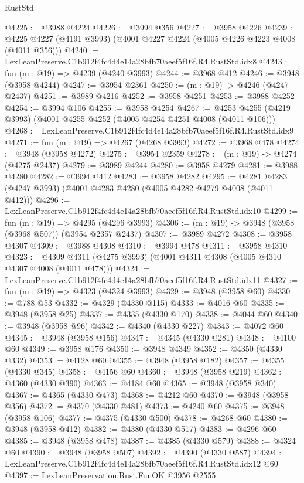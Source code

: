 \begin{lexlean}{RustStd}
\begin{coremodule}
@4225 := @3988 @4224
@4226 := @3994 @356
@4227 := @3958 @4226
@4239 := @4225 @4227 (@4191 @3993) (@4001 @4227 @4224 (@4005 @4226 @4223 @4008 (@4011 @356)))
@4240 := LexLeanPreserve.C1b912f4fc4d4e14a28bfb70aeef5f16f.R4.RustStd.idx8
@4243 := fun (m : @19) => @4239 (@4240 @3993)
@4244 := @3968 @412
@4246 := @3948 (@3958 @4244)
@4247 := @3954 @2361
@4250 := (m : @19) -> @4246 (@4247 @2437)
@4251 := @3989 @4216
@4252 := @3958 @4251
@4253 := @3988 @4252
@4254 := @3994 @106
@4255 := @3958 @4254
@4267 := @4253 @4255 (@4219 @3993) (@4001 @4255 @4252 (@4005 @4254 @4251 @4008 (@4011 @106)))
@4268 := LexLeanPreserve.C1b912f4fc4d4e14a28bfb70aeef5f16f.R4.RustStd.idx9
@4271 := fun (m : @19) => @4267 (@4268 @3993)
@4272 := @3968 @478
@4274 := @3948 (@3958 @4272)
@4275 := @3954 @2359
@4278 := (m : @19) -> @4274 (@4275 @2437)
@4279 := @3989 @4244
@4280 := @3958 @4279
@4281 := @3988 @4280
@4282 := @3994 @412
@4283 := @3958 @4282
@4295 := @4281 @4283 (@4247 @3993) (@4001 @4283 @4280 (@4005 @4282 @4279 @4008 (@4011 @412)))
@4296 := LexLeanPreserve.C1b912f4fc4d4e14a28bfb70aeef5f16f.R4.RustStd.idx10
@4299 := fun (m : @19) => @4295 (@4296 @3993)
@4306 := (m : @19) -> @3948 (@3958 (@3968 @507)) (@3954 @2357 @2437)
@4307 := @3989 @4272
@4308 := @3958 @4307
@4309 := @3988 @4308
@4310 := @3994 @478
@4311 := @3958 @4310
@4323 := @4309 @4311 (@4275 @3993) (@4001 @4311 @4308 (@4005 @4310 @4307 @4008 (@4011 @478)))
@4324 := LexLeanPreserve.C1b912f4fc4d4e14a28bfb70aeef5f16f.R4.RustStd.idx11
@4327 := fun (m : @19) => @4323 (@4324 @3993)
@4329 := @3948 (@3958 @60)
@4330 := @788 @53
@4332 := @4329 (@4330 @115)
@4333 := @4016 @60
@4335 := @3948 (@3958 @25)
@4337 := @4335 (@4330 @170)
@4338 := @4044 @60
@4340 := @3948 (@3958 @96)
@4342 := @4340 (@4330 @227)
@4343 := @4072 @60
@4345 := @3948 (@3958 @156)
@4347 := @4345 (@4330 @281)
@4348 := @4100 @60
@4349 := @3958 @176
@4350 := @3948 @4349
@4352 := @4350 (@4330 @332)
@4353 := @4128 @60
@4355 := @3948 (@3958 @182)
@4357 := @4355 (@4330 @345)
@4358 := @4156 @60
@4360 := @3948 (@3958 @219)
@4362 := @4360 (@4330 @390)
@4363 := @4184 @60
@4365 := @3948 (@3958 @340)
@4367 := @4365 (@4330 @473)
@4368 := @4212 @60
@4370 := @3948 (@3958 @356)
@4372 := @4370 (@4330 @481)
@4373 := @4240 @60
@4375 := @3948 (@3958 @106)
@4377 := @4375 (@4330 @500)
@4378 := @4268 @60
@4380 := @3948 (@3958 @412)
@4382 := @4380 (@4330 @517)
@4383 := @4296 @60
@4385 := @3948 (@3958 @478)
@4387 := @4385 (@4330 @579)
@4388 := @4324 @60
@4390 := @3948 (@3958 @507)
@4392 := @4390 (@4330 @587)
@4394 := LexLeanPreserve.C1b912f4fc4d4e14a28bfb70aeef5f16f.R4.RustStd.idx12 @60
@4397 := LexLeanPreservation.Rust.FunOK @3956 @2555

\end{coremodule}
\end{lexlean}
